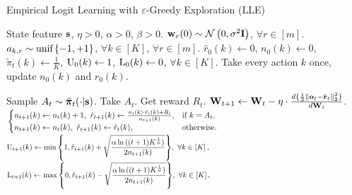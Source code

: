 \begin{algorithm}[t]
	\caption{Empirical Logit Learning with $\varepsilon$-Greedy Exploration (LLE)}
	\label{alg:logit_learning_eps_greedy_exploration}
	\begin{algorithmic}
		 State feature ${\mathbf{s}}$, $\eta > 0$, $\alpha > 0$, $\beta > 0$.
		\STATE ${\mathbf{w}}_r(0) \sim {\mathcal{N}}\left( 0, \sigma^2 {\mathbf{I}} \right)$, $\forall r \in [m]$. $a_{k, r} \sim {\text{unif}}\left\{-1, +1\right\}$, $\forall k \in [K]$, $\forall r \in [m]$.
		\STATE $\hat{r}_{0}(k) \gets 0$, $n_{0}(k) \gets 0$, $\tilde{\pi}_t(k) \gets \frac{1}{K}$, ${\text{U}}_{0}(k) \gets 1$, ${\text{L}}_{0}(k) \gets 0$, $\forall k \in [K]$.
		\STATE Take every action $k$ once, update $n_{0}(k)$ and $\hat{r}_{0}(k)$.
		
		\STATE Sample $A_{t} \sim \tilde{{\boldsymbol{\pi}}}_t(\cdot | {\mathbf{s}} )$. Take $A_{t}$. Get reward $R_t$.
		\STATE ${\mathbf{W}}_{t+1} \leftarrow {\mathbf{W}}_t - \eta \cdot \frac{d \{ \frac{1}{2} \left\| {\mathbf{o}}_t - \hat{{\mathbf{r}}}_t \right\|_2^2 \}}{d {\mathbf{W}}_t}$.
		\STATE $\scalemath{0.8}{  \left. 
		    \begin{cases}
		    n_{t+1}(k) \gets n_{t}(k) + 1, \ \hat{r}_{t+1}(k) \gets \frac{n_{t}(k) \cdot \hat{r}_{t}(k) + R_t }{n_{t+1}(k)}, & \text{if } k = A_t, \\
		    n_{t+1}(k) \gets n_{t}(k), \ \hat{r}_{t+1}(k) \gets \hat{r}_{t}(k), & \text{otherwise}.
		    \end{cases}
		    \right. }$
		\STATE $\scalemath{0.75}{ \ucb_{t+1}(k) \gets
		    \min{\left\{ 1, \hat{r}_{t+1}(k) + \sqrt{\frac{\alpha \ln{( (t+1) K^{\frac{1}{\alpha}})}}{2 n_{t+1}(k)}}\right\}}, \ \forall k \in [K] }$.
		\STATE $\scalemath{0.75}{ \lcb_{t+1}(k) \gets 
		    \max{\left\{ 0, \hat{r}_{t+1}(k) - \sqrt{\frac{\alpha \ln{( (t+1) K^{\frac{1}{\alpha}})}}{2 n_{t+1}(k)}}\right\}}, \ \forall k \in [K] } $.
		

\end{algorithmic}
\end{algorithm}
